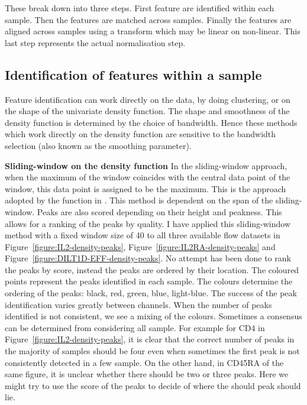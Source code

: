 These break down into three steps.
First feature are identified within each sample.
Then the features are matched across samples.
Finally the features are aligned across samples using a transform which
may be linear on non-linear.
This last step represents the actual normalisation step.

\subsection{Identification of features within a sample}

Feature identification can work directly on the data, by doing clustering,
or on the shape of the univariate density function.  
The shape and smoothness of the density function is determined by the choice of bandwidth.
Hence these methods which work directly on the density function are sensitive to the bandwidth selection (also known as the smoothing parameter).

\textbf{Sliding-window on the density function}
In the sliding-window approach, when the maximum of the window coincides with the central data point of the window, 
this data point is assigned to be the maximum.
This is the approach adopted by the  function in .
This method is dependent on the span of the sliding-window.
Peaks are also scored depending on their height and peakness.
This allows for a ranking of the peaks by quality.
I have applied this sliding-window method with a fixed window size of 40 to all three available flow datasets in Figure~\ref{figure:IL2-density-peaks},
Figure~\ref{figure:IL2RA-density-peaks} and Figure~\ref{figure:DILT1D-EFF-density-peaks}.
No attempt has been done to rank the peaks by score, instead the peaks are ordered by their location.
The coloured points represent the peaks identified in each sample.
The colours determine the ordering of the peaks: black, red, green, blue, light-blue.
The success of the peak identification varies greatly between channels.
When the number of peaks identified is not consistent, we see a mixing of the colours.
Sometimes a consensus can be determined from considering all sample.
For example for CD4 in Figure~\ref{figure:IL2-density-peaks}, it is clear
that the correct number of peaks in the majority of samples should be four even when sometimes the first peak is not consistently detected
in a few sample.
On the other hand, in CD45RA of the same figure, it is unclear whether there should be two or three peaks.
Here we might try to use the score of the peaks to decide of where the should peak should lie.


